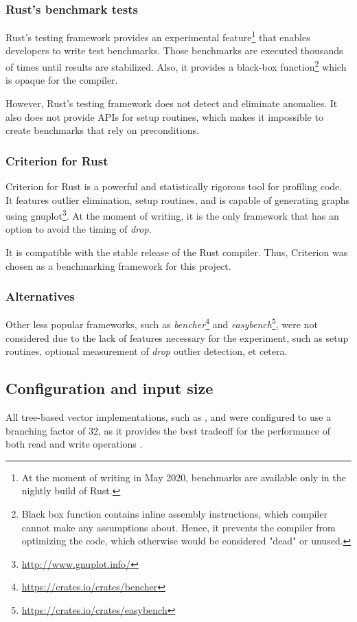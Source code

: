 \subsubsection*{Rust's benchmark tests}
Rust's testing framework provides an experimental feature\footnote{At the moment of writing in May 2020, benchmarks are available only in the nightly build of Rust.} that enables developers to write test benchmarks. Those benchmarks are executed thousands of times until results are stabilized. Also, it provides a black-box function\footnote{Black box function contains inline assembly instructions, which compiler cannot make any assumptions about. Hence, it prevents the compiler from optimizing the code, which otherwise would be considered "dead" or unused.} which is opaque for the compiler.

However, Rust's testing framework does not detect and eliminate anomalies. It also does not provide APIs for setup routines, which makes it impossible to create benchmarks that rely on preconditions.

\subsubsection*{Criterion for Rust}
Criterion for Rust is a powerful and statistically rigorous tool for profiling code. It features outlier elimination, setup routines, and is capable of generating graphs using gnuplot\footnote{\url{http://www.gnuplot.info/}}. At the moment of writing, it is the only framework that has an option to avoid the timing of \emph{drop}.

It is compatible with the stable release of the Rust compiler. Thus, Criterion was chosen as a benchmarking framework for this project.

\subsubsection*{Alternatives}
Other less popular frameworks, such as \emph{bencher}\footnote{\url{https://crates.io/crates/bencher}} and \emph{easybench}\footnote{\url{https://crates.io/crates/easybench}}, were not considered due to the lack of features necessary for the experiment, such as setup routines, optional measurement of \emph{drop} outlier detection, et cetera.

\subsection{Configuration and input size}
All tree-based vector implementations, such as \rbvec{}, \rrbvec{} and \pvec{} were configured to use a branching factor of 32, as it provides the best tradeoff for the performance of both read and write operations \cite{efficient-immutable-vectors}.

